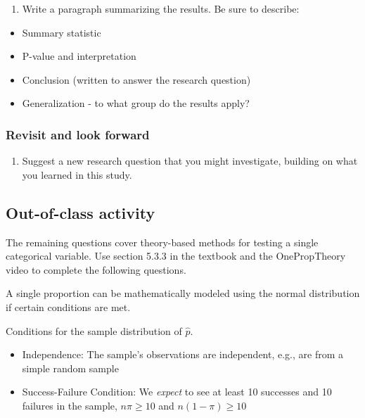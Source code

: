 \documentclass[
]{report}
\providecommand{\tightlist}{%
  \setlength{\itemsep}{0pt}\setlength{\parskip}{0pt}}
\begin{document}
\begin{enumerate}
\def\labelenumi{\arabic{enumi}.}
\setcounter{enumi}{25}
\tightlist
\item
  Write a paragraph summarizing the results. Be sure to describe:
\end{enumerate}

\begin{itemize}
\item
  Summary statistic
\item
  P-value and interpretation
\item
  Conclusion (written to answer the research question)
\item
  Generalization - to what group do the results apply?
\end{itemize}

\vspace{3in}

\hypertarget{revisit-and-look-forward}{%
\subsubsection*{Revisit and look forward}\label{revisit-and-look-forward}}

\begin{enumerate}
\def\labelenumi{\arabic{enumi}.}
\setcounter{enumi}{26}
\tightlist
\item
  Suggest a new research question that you might investigate, building on what you learned in this study.
\end{enumerate}

\vspace{.6in}

\hypertarget{out-of-class-activity-5}{%
\subsection{Out-of-class activity}\label{out-of-class-activity-5}}

The remaining questions cover theory-based methods for testing a single categorical variable. Use section 5.3.3 in the textbook and the OnePropTheory video to complete the following questions.

A single proportion can be mathematically modeled using the normal distribution if certain conditions are met.

Conditions for the sample distribution of \(\hat{p}\).

\begin{itemize}
\item
  Independence: The sample's observations are independent, e.g., are from a simple random sample
\item
  Success-Failure Condition: We \emph{expect} to see at least 10 successes and 10 failures in the sample, \(n\pi≥10\) and \(n(1-\pi)≥10\)
\end{itemize}
\end{document}
